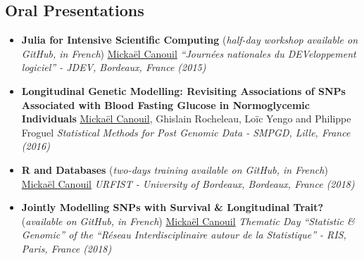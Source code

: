 \documentclass[11pt,a4paper,sans]{moderncv}
\begin{document}
\subsection{Oral Presentations}
\begin{itemize}
    \setlength{\itemsep}{0.5em}

    \item \textbf{Julia for Intensive Scientific Computing} (\textit{half-day workshop available on GitHub, in French})
        \newline \underline{Mickaël Canouil}
        \newline \textit{``Journées nationales du DEVeloppement logiciel'' - JDEV, Bordeaux, France (2015)}

    \item \textbf{Longitudinal Genetic Modelling: Revisiting Associations of SNPs Associated with Blood Fasting Glucose in Normoglycemic Individuals}
        \newline \underline{Mickaël Canouil}, Ghislain Rocheleau, Loïc Yengo and Philippe Froguel
        \newline \textit{Statistical Methods for Post Genomic Data - SMPGD, Lille, France (2016)}
    
    \item \textbf{R and Databases} (\textit{two-days training available on GitHub, in French})
        \newline \underline{Mickaël Canouil}
        \newline \textit{URFIST - University of Bordeaux, Bordeaux, France (2018)}
        
    \item \textbf{Jointly Modelling SNPs with Survival \& Longitudinal Trait?} (\textit{available on GitHub, in French})
        \newline \underline{Mickaël Canouil}
        \newline \textit{Thematic Day ``Statistic \& Genomic'' of the ``Réseau Interdisciplinaire autour de la Statistique'' - RIS, Paris, France (2018)}

\end{itemize}
\end{document}
